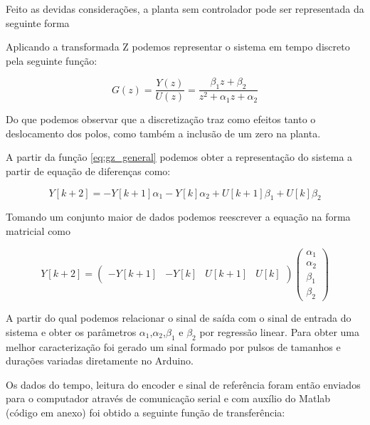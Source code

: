 \documentclass[a4paper,11pt]{article}
\begin{document}
Feito as devidas considerações, a planta sem controlador pode ser representada da seguinte forma


Aplicando a transformada Z podemos representar o sistema em tempo discreto pela seguinte função:

\begin{equation}\label{eq:gz_general}
    G(z) = \frac{Y(z)}{U(z)} = \frac{\beta_1 z + \beta_2}{z^2 + \alpha_1 z + \alpha_2}
\end{equation}

Do que podemos observar que a discretização traz como efeitos tanto o deslocamento dos polos, como também a inclusão de um zero na planta.

A partir da função \ref{eq:gz_general} podemos obter a representação do sistema a partir de equação de diferenças como:

\begin{equation}\label{eq:gz_general}
  Y[k+2] = -Y[k+1]\alpha_1 - Y[k]\alpha_2 + U[k+1]\beta_1 + U[k]\beta_2
\end{equation}

Tomando um conjunto maior de dados podemos reescrever a equação na forma matricial como

\begin{equation}\label{eq:gz_general}
  Y[k+2] = 
  \left( \begin{array}{cccc}
  -Y[k+1] & -Y[k] & U[k+1] & U[k]
  \end{array} \right)
  \left(\begin{array}{c}
    \alpha_1\\ \alpha_2 \\ \beta_1 \\ \beta_2
  \end{array}\right)
\end{equation}

A partir do qual podemos relacionar o sinal de saída com o sinal de entrada do sistema e obter os parâmetros $\alpha_1$,$\alpha_2$,$\beta_1$ e $\beta_2$ por regressão linear. Para obter uma melhor caracterização foi gerado um sinal formado por pulsos de tamanhos e durações variadas diretamente no Arduino. %


Os dados do tempo, leitura do encoder e sinal de referência foram então enviados para o computador através de comunicação serial e com auxílio do Matlab (código em anexo) foi obtido a seguinte função de transferência:
\end{document}
